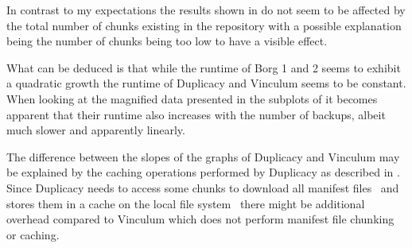 In contrast to my expectations the results shown in 
do not seem to be affected by the total number of chunks existing in the repository
with a possible explanation being the number of chunks being too low to have a
visible effect.

What can be deduced is that while the runtime of Borg 1 and 2 seems to exhibit
a quadratic growth the runtime of Duplicacy and Vinculum seems to be constant.
When looking at the magnified data presented in the subplots of 
it becomes apparent that their runtime also increases with the number of backups,
albeit much slower and apparently linearly.

The difference between the slopes of the graphs of Duplicacy and Vinculum
may be explained by the caching operations performed by Duplicacy as described
in .
Since Duplicacy needs to access some chunks to download all manifest
files~\cite[section `Naming Chunks']{Duplicacy} and stores them in a cache on the
local file system~\cite[topic `Cache folder is is extremely big!']{Duplicacy-Forum}
there might be additional overhead compared to Vinculum which does not perform
manifest file chunking or caching.

